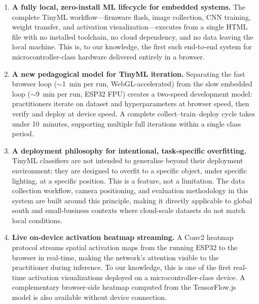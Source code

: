 \documentclass[11pt]{article}
\begin{document}
\begin{enumerate}
  \item \textbf{A fully local, zero-install ML lifecycle for embedded systems.}
        The complete TinyML workflow---firmware flash, image collection, CNN training,
        weight transfer, and activation visualization---executes from a single HTML file
        with no installed toolchain, no cloud dependency, and no data leaving the local
        machine. This is, to our knowledge, the first such end-to-end system for
        microcontroller-class hardware delivered entirely in a browser.

  \item \textbf{A new pedagogical model for TinyML iteration.} Separating the fast
        browser loop ($\sim$1~min per run, WebGL-accelerated) from the slow embedded loop
        ($\sim$9~min per run, ESP32 FPU) creates a two-speed development model: practitioners
        iterate on dataset and hyperparameters at browser speed, then verify and deploy at
        device speed. A complete collect--train--deploy cycle takes under 10~minutes,
        supporting multiple full iterations within a single class period.

  \item \textbf{A deployment philosophy for intentional, task-specific overfitting.}
        TinyML classifiers are not intended to generalise beyond their deployment environment;
        they are designed to overfit to a specific object, under specific lighting, at a specific
        position. This is a feature, not a limitation. The data collection workflow, camera
        positioning, and evaluation methodology in this system are built around this principle,
        making it directly applicable to global south and small-business contexts where
        cloud-scale datasets do not match local conditions.

  \item \textbf{Live on-device activation heatmap streaming.}
        A Conv2 heatmap protocol streams spatial activation maps from the running ESP32
        to the browser in real-time, making the network's attention visible to the
        practitioner during inference. To our knowledge, this is one of the first
        real-time activation visualizations deployed on a microcontroller-class device.
        A complementary browser-side heatmap computed from the TensorFlow.js model
        is also available without device connection.
\end{enumerate}
\end{document}
